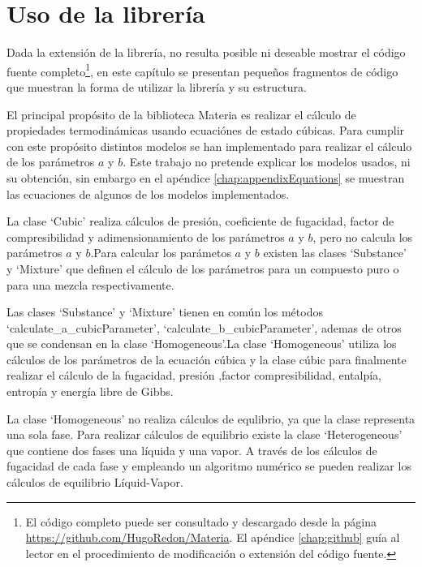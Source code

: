 \chapter{Uso de la librería}\label{chap:libraryUse}
	
	Dada la extensión de la librería, no resulta posible ni deseable mostrar el código fuente completo\footnote{El código completo puede ser consultado y descargado desde la página \url{https://github.com/HugoRedon/Materia}. El apéndice \ref{chap:github} guía al lector en el procedimiento de modificación o extensión del código fuente.}, en este capítulo se presentan pequeños fragmentos de código que muestran la forma de utilizar la librería y su estructura.

	El principal propósito de la biblioteca Materia es realizar el cálculo de propiedades termodinámicas usando ecuaciónes de estado cúbicas. Para cumplir con este propósito distintos modelos se han implementado para realizar el cálculo de los parámetros $a$ y $b$. Este trabajo no pretende explicar los modelos usados, ni su obtención, sin embargo en el apéndice \ref{chap:appendixEquations} se muestran las ecuaciones de algunos de los modelos implementados. 
		
	La clase `Cubic' realiza cálculos de presión, coeficiente de fugacidad, factor de compresibilidad y adimensionamiento de los parámetros $a$ y $b$, pero no calcula los parámetros $a$ y $b$.Para calcular los parámetos $a$ y $b$ existen las clases `Substance' y `Mixture' que definen el cálculo de los parámetros para un compuesto puro o para una mezcla respectivamente. 

	Las clases `Substance' y `Mixture' tienen en común los métodos `calculate\_a\_cubicParameter', `calculate\_b\_cubicParameter', ademas de otros que se condensan en la clase `Homogeneous'.La clase `Homogeneous' utiliza los cálculos de los parámetros de la ecuación cúbica y la clase cúbic para finalmente realizar el cálculo de la fugacidad, presión ,factor compresibilidad, entalpía, entropía y energía libre de Gibbs.

	La clase `Homogeneous' no realiza cálculos de equlibrio, ya que la clase representa una sola fase. Para realizar cálculos de equilibrio existe la clase `Heterogeneous' que contiene dos fases una líquida y una vapor. A través de los cálculos de fugacidad de cada fase y empleando un algoritmo numérico se pueden realizar los cálculos de equilibrio Líquid-Vapor.


